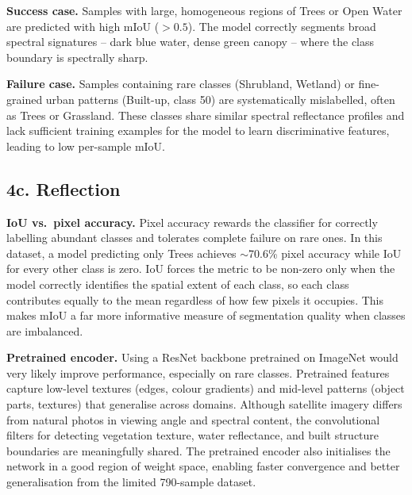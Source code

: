 \documentclass[11pt,letterpaper]{article}
\begin{document}
\textbf{Success case.} Samples with large, homogeneous regions of Trees or Open Water are predicted with high mIoU ($>0.5$). The model correctly segments broad spectral signatures -- dark blue water, dense green canopy -- where the class boundary is spectrally sharp.

\textbf{Failure case.} Samples containing rare classes (Shrubland, Wetland) or fine-grained urban patterns (Built-up, class 50) are systematically mislabelled, often as Trees or Grassland. These classes share similar spectral reflectance profiles and lack sufficient training examples for the model to learn discriminative features, leading to low per-sample mIoU.

\subsection{4c. Reflection}

\textbf{IoU vs.\ pixel accuracy.} Pixel accuracy rewards the classifier for correctly labelling abundant classes and tolerates complete failure on rare ones. In this dataset, a model predicting only Trees achieves $\sim$70.6\% pixel accuracy while IoU for every other class is zero. IoU forces the metric to be non-zero only when the model correctly identifies the spatial extent of each class, so each class contributes equally to the mean regardless of how few pixels it occupies. This makes mIoU a far more informative measure of segmentation quality when classes are imbalanced.

\textbf{Pretrained encoder.} Using a ResNet backbone pretrained on ImageNet would very likely improve performance, especially on rare classes. Pretrained features capture low-level textures (edges, colour gradients) and mid-level patterns (object parts, textures) that generalise across domains. Although satellite imagery differs from natural photos in viewing angle and spectral content, the convolutional filters for detecting vegetation texture, water reflectance, and built structure boundaries are meaningfully shared. The pretrained encoder also initialises the network in a good region of weight space, enabling faster convergence and better generalisation from the limited 790-sample dataset.
\end{document}
